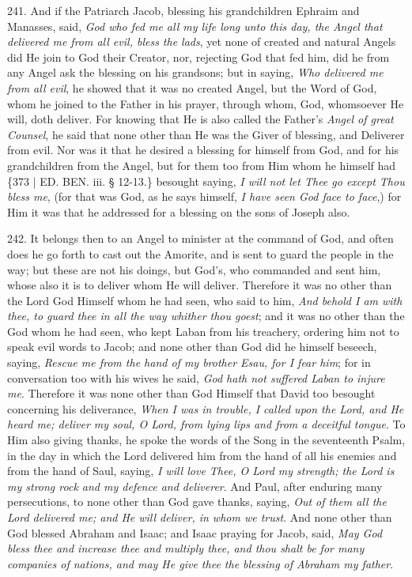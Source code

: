 241. And if
the Patriarch Jacob, blessing his grandchildren Ephraim and Manasses,
said, \emph{God who fed me all my life long unto this day, the Angel that
delivered me from all evil, bless the lads}, yet none of created
and natural Angels did He join to God their Creator, nor, rejecting
God that fed him, did he from any Angel ask the blessing on his
grandsons; but in saying, \emph{Who delivered me from all evil}, he
showed that it was no created Angel, but the Word of God, whom he
joined to the Father in his prayer, through whom, God, whomsoever He
will, doth deliver. For knowing that He is also called the Father's \emph{Angel
of great Counsel}, he said that none other than He was the Giver of
blessing, and Deliverer from evil. Nor was it that he desired a
blessing for himself from God, and for his grandchildren from the
Angel, but for them too from Him whom he himself had \{373 | ED. BEN. iii. § 12-13.\}
besought saying, \emph{I will not let Thee go except Thou} \emph{bless me},
(for that was God, as he says himself, \emph{I have seen God face to face},)
for Him it was that he addressed for a blessing on the sons of Joseph
also.

242. It
belongs then to an Angel to minister at the command of God, and often
does he go forth to cast out the Amorite, and is sent to guard the
people in the way; but these are not his doings, but God's, who
commanded and sent him, whose also it is to deliver whom He will
deliver. Therefore it was no other than the Lord God Himself whom he
had seen, who said to him, \emph{And behold I am with thee, to guard thee
in all the way whither thou goest}; and it was no other than the
God whom he had seen, who kept Laban from his treachery, ordering him
not to speak evil words to Jacob; and none other than God did he
himself beseech, saying, \emph{Rescue me from the hand of my brother
Esau, for I fear him}; for in conversation too with his wives he
said, \emph{God hath not suffered Laban to injure me}. Therefore it
was none other than God Himself that David too besought concerning his
deliverance, \emph{When I was in trouble, I called upon the Lord, and He
heard me; deliver my soul, O Lord, from lying lips and from a
deceitful tongue}. To Him also giving thanks, he spoke the words of
the Song in the seventeenth Psalm, in the day in which the Lord
delivered him from the hand of all his enemies and from the hand of
Saul, saying, \emph{I will love Thee, O Lord my strength; the Lord is my
strong rock and my defence and deliverer}. And Paul, after enduring
many persecutions, to none other than God gave thanks, saying, \emph{Out
of them all the Lord delivered me; and He will deliver, in whom we
trust}. And none other than God blessed Abraham and Isaac; and
Isaac praying for Jacob, said, \emph{May God bless thee and increase thee
and multiply thee, and thou shalt be for many companies of nations,
and may He give thee the blessing of Abraham my father}.

